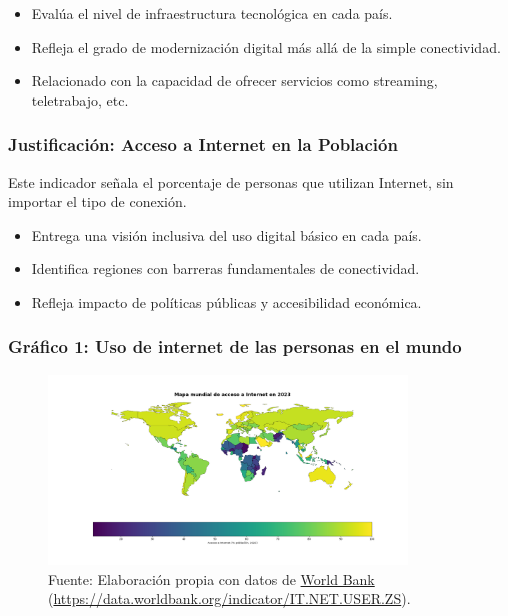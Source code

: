 \documentclass[12pt, a4paper]{article}
\begin{document}
\begin{itemize}
    \item Evalúa el nivel de infraestructura tecnológica en cada país.
    \item Refleja el grado de modernización digital más allá de la simple conectividad.
    \item Relacionado con la capacidad de ofrecer servicios como streaming, teletrabajo, etc.
\end{itemize}

\subsubsection*{Justificación: Acceso a Internet en la Población}
Este indicador señala el porcentaje de personas que utilizan Internet, sin importar el tipo de conexión.

\begin{itemize}
    \item Entrega una visión inclusiva del uso digital básico en cada país.
    \item Identifica regiones con barreras fundamentales de conectividad.
    \item Refleja impacto de políticas públicas y accesibilidad económica.
\end{itemize}

\subsubsection*{Gráfico 1: Uso de internet de las personas en el mundo}
\begin{figure}[H]
    \centering
    \includegraphics[width=0.85\textwidth]{images/Grafico_uso_de_internet_FC.png}
    \caption[1]{Fuente: Elaboración propia con datos de \href{https://data.worldbank.org}{World Bank} 
    (\url{https://data.worldbank.org/indicator/IT.NET.USER.ZS}).}
\end{figure}
\end{document}
